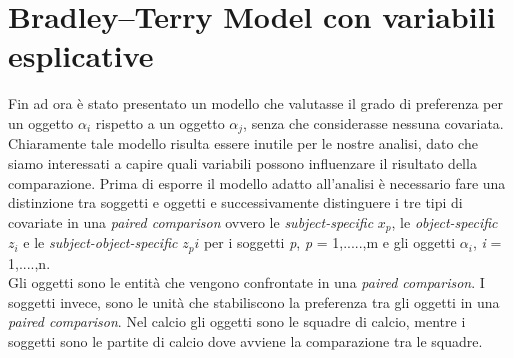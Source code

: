 \section{Bradley–Terry Model con variabili esplicative}
Fin ad ora è stato presentato un modello che valutasse il grado di preferenza per un oggetto $\alpha_{i}$ rispetto a un oggetto $\alpha_{j}$, senza che considerasse nessuna covariata. Chiaramente tale modello risulta essere inutile per le nostre analisi, dato che siamo interessati a capire quali variabili possono influenzare il risultato della comparazione. Prima di esporre il modello adatto all'analisi è necessario fare una distinzione tra soggetti e oggetti e successivamente distinguere i tre tipi di covariate in una \emph{paired comparison} ovvero le \emph{subject-specific} $x_p$, le \emph{object-specific} $z_i$ e le \emph{subject-object-specific} $z_pi$ per i soggetti \emph{p}, \emph{p} = 1,.....,m e gli oggetti $\alpha_{i}$, \emph{i} = 1,....,n.\\
Gli oggetti sono le entità che vengono confrontate in una \emph{paired comparison}. I soggetti invece, sono le unità che stabiliscono la preferenza tra gli oggetti in una \emph{paired comparison}. Nel calcio gli oggetti sono le squadre di calcio, mentre i soggetti sono le partite di calcio dove avviene la comparazione tra le squadre.\\

